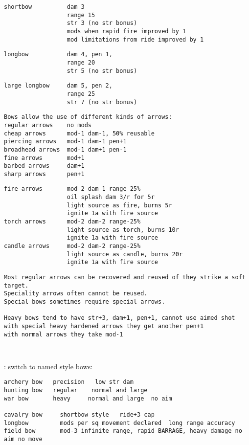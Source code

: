 \begin{samepage}
\begin{verbatim}
shortbow          dam 3
                  range 15
                  str 3 (no str bonus)
                  mods when rapid fire improved by 1
                  mod limitations from ride improved by 1
\end{verbatim} \blocklistgap \begin{verbatim}
longbow           dam 4, pen 1,
                  range 20
                  str 5 (no str bonus)
\end{verbatim} \blocklistgap \begin{verbatim}
large longbow     dam 5, pen 2,
                  range 25
                  str 7 (no str bonus)
\end{verbatim} \blocklistgap \begin{verbatim}
Bows allow the use of different kinds of arrows:
regular arrows    no mods
cheap arrows      mod-1 dam-1, 50% reusable
piercing arrows   mod-1 dam-1 pen+1
broadhead arrows  mod-1 dam+1 pen-1
fine arrows       mod+1
barbed arrows     dam+1
sharp arrows      pen+1
\end{verbatim} \blocklistgap \begin{verbatim}
fire arrows       mod-2 dam-1 range-25%
                  oil splash dam 3/r for 5r
                  light source as fire, burns 5r
                  ignite 1a with fire source
torch arrows      mod-2 dam-2 range-25%
                  light source as torch, burns 10r
                  ignite 1a with fire source
candle arrows     mod-2 dam-2 range-25%
                  light source as candle, burns 20r
                  ignite 1a with fire source
\end{verbatim} \blocklistgap \begin{verbatim}
Most regular arrows can be recovered and reused of they strike a soft target.
Speciality arrows often cannot be reused.
Special bows sometimes require special arrows.

Heavy bows tend to have str+3, dam+1, pen+1, cannot use aimed shot
with special heavy hardened arrows they get another pen+1
with normal arrows they take mod-1
\end{verbatim} \end{samepage} \normalsize \goodbreak

\




\vspace{20mm}
\tmpsepline
\TODO: switch to named style bows:
\small \begin{verbatim}
archery bow   precision   low str dam
hunting bow   regular    normal and large
war bow       heavy     normal and large  no aim

cavalry bow     shortbow style   ride+3 cap
longbow         mods per sq movement declared  long range accuracy
field bow       mod-3 infinite range, rapid BARRAGE, heavy damage no aim no move
\end{verbatim} \normalsize
\tmpsepline
\vspace{20mm}




